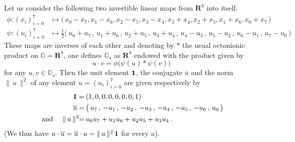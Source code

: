 \documentclass[11pt]{amsart}
\begin{document}
Let us consider the following two invertible linear maps from $\mathbf R^8$ into itself. 
\begin{align*}%
\phi : (x_i)_{i=0}^7 &\longmapsto \big(\, x_{0}-x_{7}, x_{1}-x_{6}, x_{2}-x_{5}, x_{3}-x_{4}, x_{3}+x_{4}, 
x_{2}+x_{5}, x_{1}+x_{6}, x_{0}+x_{7}\,\big) \\
\psi : 
(u_i)_{i=0}^7 & \longmapsto  \frac12
\big(\, {u_{0}}  + {u_{7}}  \, , \,  {u_{1}}  + {u_{6}}  
\, , \,   {u_2  }  + {u_{5}}  \, , \,  {u_{3}}  + {u_{4}}  \, , \, 
   {u_{4}}- {u_{3}}  \, , \,    {u_{5}}- {u_2  }  \, , \,
   {u_{6}}- {u_{1}}  \, , \,  {u_{7}}  - {u_{0}}  
 \, \big) 
\end{align*}%
These maps are inverses of each other and denoting by 
$*$ the usual octonionic product on $\mathbb O=\mathbf R^8$, one defines $\mathbb O_s$ as $\mathbf R^8$ endowed with the product given by
\begin{equation}%
\label{Eq:Special-Octonionic-Product}
u\cdot v=\phi\big(  \psi(u)*\psi(v) \big)
\end{equation}%
 for any $u,v\in \mathbb O_s$. 
 Then the unit element ${\bf 1}$, the conjugate $\overline{u}$ and the norm $\lVert \, u\, \lVert^2$ of any element $u=(u_i)_{i=0}^7$ are given respectively by 
 \begin{align*}
{\bf 1}=&\, (1,0,0,0,0,0,0,1)\\
 \overline{u}=&\,
\big( \, u_{7} \, , \, -u_{1} \, , \, -u_{2} \, , \, -u_{3}\, , \, -u_{4} \, , \, -u_{5} \, , \, -u_{6} \, , \, u_{0}\, 
\big) 
\\ \mbox{ and } \quad 
\lVert\,u\,\lVert^2 =&\, 
u_{0} u_{7}+u_{1} u_{6}+u_{2} u_{5}+u_{3} u_{4}\, .
\end{align*}
(We thus have $u\cdot \overline{u} = \overline{u} \cdot u=
\lVert\,u\,\lVert^2 \,{\bf 1}$ for every $u$).
\end{document}
